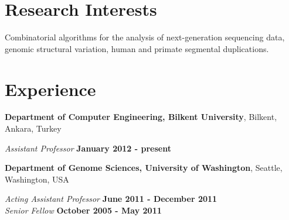 \documentclass[margin,line]{res}
\begin{document}
\begin{resume}

  
  
  \section{\sc Research Interests}
  Combinatorial algorithms for the analysis of next-generation sequencing data, 
  genomic structural variation,  human and primate
  segmental duplications. %

          \section{\sc Experience}
                  {\bf Department of Computer Engineering, Bilkent University},
                  Bilkent, Ankara, Turkey
                  
                  \vspace{-.2cm}
                         {\em Assistant Professor} \hfill {\bf January 2012 - present} 
                         
                         
                         {\bf Department of Genome Sciences, University of Washington},
                         Seattle, Washington, USA
                         
                         \vspace{-.2cm}
                                {\em Acting Assistant Professor} \hfill {\bf June 2011 - December 2011} \\
                                
                                \vspace{-.2cm}
                                       {\em Senior Fellow} \hfill {\bf October 2005 - May 2011}
                                       

\end{resume}
\end{document}
